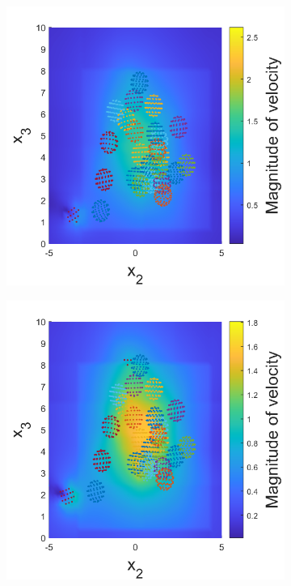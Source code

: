 \begin{figure}
\begin{subfigure}[b]{0.22\textwidth}
    \caption[]{\label{fig:squirmerE}}
\end{subfigure}
\begin{subfigure}[b]{0.22\textwidth}
    \centering
    \includegraphics[width=\textwidth]{Images/squirmers/Gyro-6.pdf}
    \caption[]{\label{fig:squirmerF}}
\end{subfigure}
\begin{subfigure}[b]{0.22\textwidth}
    \centering
    \includegraphics[width=\textwidth]{Images/squirmers/Gyro-7.pdf}

\end{subfigure}
\end{figure}
